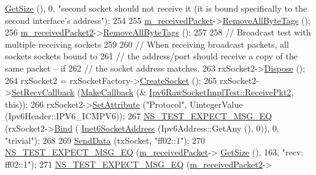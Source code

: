 \begin{DoxyCode}
      \hyperlink{classns3_1_1Packet_a462855c9929954d4301a4edfe55f4f1c}{GetSize} (), 0, \textcolor{stringliteral}{"second socket should not receive it (it is bound specifically to the second
       interface's address"});
254 
255   \hyperlink{classIpv6RawSocketImplTest_a57057bfb5f48de92165d7c3dfb8ff7ea}{m\_receivedPacket}->\hyperlink{classns3_1_1Packet_a083f54c9db31aeff30551a9e20fcda42}{RemoveAllByteTags} ();
256   \hyperlink{classIpv6RawSocketImplTest_a1b23c24c9271e6874968546857829676}{m\_receivedPacket2}->\hyperlink{classns3_1_1Packet_a083f54c9db31aeff30551a9e20fcda42}{RemoveAllByteTags} ();
257 
258   \textcolor{comment}{// Broadcast test with multiple receiving sockets}
259 
260   \textcolor{comment}{// When receiving broadcast packets, all sockets sockets bound to}
261   \textcolor{comment}{// the address/port should receive a copy of the same packet -- if}
262   \textcolor{comment}{// the socket address matches.}
263   rxSocket2->\hyperlink{classns3_1_1Object_aa90ae598863f6c251cdab3c3722afdaf}{Dispose} ();
264   rxSocket2 = rxSocketFactory->\hyperlink{classns3_1_1SocketFactory_a97351e6e7860503a4912042530449f62}{CreateSocket} ();
265   rxSocket2->\hyperlink{classns3_1_1Socket_a243f7835ef1a85f9270fd3577e3a40da}{SetRecvCallback} (\hyperlink{group__makecallbackmemptr_ga9376283685aa99d204048d6a4b7610a4}{MakeCallback} (&
      \hyperlink{classIpv6RawSocketImplTest_a73518b969e0e8a02bdc0bdd8edb07842}{Ipv6RawSocketImplTest::ReceivePkt2}, \textcolor{keyword}{this}));
266   rxSocket2->\hyperlink{classns3_1_1ObjectBase_ac60245d3ea4123bbc9b1d391f1f6592f}{SetAttribute} (\textcolor{stringliteral}{"Protocol"}, UintegerValue (Ipv6Header::IPV6\_ICMPV6));
267   \hyperlink{group__testing_ga7304ba46a28d8cf08dfdfd6499cf7068}{NS\_TEST\_EXPECT\_MSG\_EQ} (rxSocket2->\hyperlink{classns3_1_1Socket_ada93439a43de2028b5a8fc6621dad482}{Bind} (
      \hyperlink{classns3_1_1Inet6SocketAddress}{Inet6SocketAddress} (Ipv6Address::GetAny (), 0)), 0, \textcolor{stringliteral}{"trivial"});
268 
269   \hyperlink{classIpv6RawSocketImplTest_adc52ab615ef78fee05ac8783d94ce799}{SendData} (txSocket, \textcolor{stringliteral}{"ff02::1"});
270   \hyperlink{group__testing_ga7304ba46a28d8cf08dfdfd6499cf7068}{NS\_TEST\_EXPECT\_MSG\_EQ} (\hyperlink{classIpv6RawSocketImplTest_a57057bfb5f48de92165d7c3dfb8ff7ea}{m\_receivedPacket}->
      \hyperlink{classns3_1_1Packet_a462855c9929954d4301a4edfe55f4f1c}{GetSize} (), 163, \textcolor{stringliteral}{"recv: ff02::1"});
271   \hyperlink{group__testing_ga7304ba46a28d8cf08dfdfd6499cf7068}{NS\_TEST\_EXPECT\_MSG\_EQ} (\hyperlink{classIpv6RawSocketImplTest_a1b23c24c9271e6874968546857829676}{m\_receivedPacket2}->

\end{DoxyCode}
